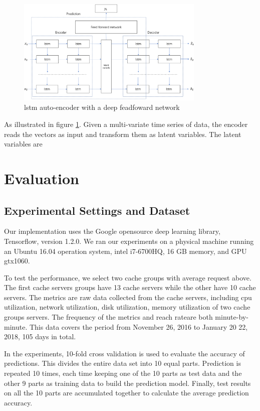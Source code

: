 \documentclass[5p]{elsarticle}
\newcommand{\dabiaolv}{reach rate}
\begin{document}
\begin{figure}[h]
    \centering
    \includegraphics[width=0.8\textwidth]{our_models.png}
    \caption{lstm auto-encoder with a deep feadfoward network}
    \label{fig:our_models}
\end{figure}

As illustrated in figure \ref{fig:our_models}. Given a multi-variate time series of data, the encoder reads the vectors as input and transform them as latent variables. The latent variables are  

\section{Evaluation}
\subsection{Experimental Settings and Dataset}
Our implementation uses the Google opensource deep learning library, Tensorflow, version 1.2.0. We ran our experiments on a physical machine running an Ubuntu 16.04 operation system, intel i7-6700HQ, 16 GB memory, and GPU gtx1060.

To test the performance, we select two cache groups with average request above. The first cache servers groups have 13 cache servers while the other have 10 cache servers. The  metrics are raw data collected from the cache servers, including cpu utilization, network utilization, disk utilization, memory utilization of two cache groups servers. The frequency of the metrics and  \dabiaolv are both minute-by-minute. This data covers the period from November 26, 2016 to January 20 22, 2018, 105 days in total.

In the experiments, 10-fold cross validation is used to evaluate the accuracy of predictions. This divides the entire data set into 10 equal parts.  Prediction is repeated 10 times, each time keeping one of the 10 parts as test data and the other 9 parts as training data to build the prediction model. Finally, test results on all the 10 parts are accumulated together to calculate the average prediction accuracy.
\end{document}
